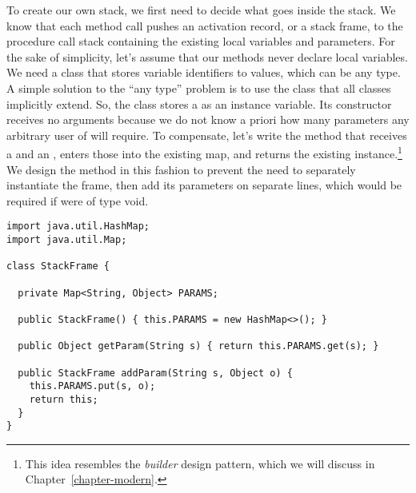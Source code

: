 
To create our own stack, we first need to decide what goes inside the stack. We know that each method call pushes an activation record, or a stack frame, to the procedure call stack containing the existing local variables and parameters. For the sake of simplicity, let's assume that our methods never declare local variables. We need a class that stores variable identifiers to values, which can be any type. A simple solution to the ``any type'' problem is to use the  class that all classes implicitly extend. So, the  class stores a  as an instance variable. Its constructor receives no arguments because we do not know a priori how many parameters any arbitrary user of  will require. To compensate, let's write the  method that receives a  and an , enters those into the existing map, and returns the existing instance.\footnote{This idea resembles the \textit{builder} design pattern, which we will discuss in Chapter~\ref{chapter-modern}.} We design the method in this fashion to prevent the need to separately instantiate the frame, then add its parameters on separate lines, which would be required if  were of type void.

\begin{cl}{}
\begin{lstlisting}[language=MyJava]
import java.util.HashMap;
import java.util.Map;

class StackFrame {

  private Map<String, Object> PARAMS;

  public StackFrame() { this.PARAMS = new HashMap<>(); }

  public Object getParam(String s) { return this.PARAMS.get(s); }

  public StackFrame addParam(String s, Object o) {
    this.PARAMS.put(s, o);
    return this;
  }
}
\end{lstlisting}
\end{cl}

